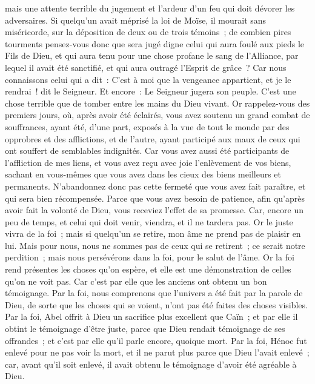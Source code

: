 \begin{multicols}{2}
mais une attente terrible du jugement et l'ardeur d'un feu qui doit dévorer les adversaires.
Si quelqu'un avait méprisé la loi de Moïse, il mourait sans miséricorde, sur la déposition de deux ou de trois témoins~;
de combien pires tourments pensez-vous donc que sera jugé digne celui qui aura foulé aux pieds le Fils de Dieu, et qui aura tenu pour une chose profane le sang de l'Alliance, par lequel il avait été sanctifié, et qui aura outragé l'Esprit de grâce~?
Car nous connaissons celui qui a dit~: C'est à moi que la vengeance appartient, et je le rendrai~! dit le Seigneur. Et encore~: Le Seigneur jugera son peuple.
C'est une chose terrible que de tomber entre les mains du Dieu vivant.
Or rappelez-vous des premiers jours, où, après avoir été éclairés, vous avez soutenu un grand combat de souffrances,
ayant été, d'une part, exposés à la vue de tout le monde par des opprobres et des afflictions, et de l'autre, ayant participé aux maux de ceux qui ont souffert de semblables indignités.
Car vous avez aussi été participants de l'affliction de mes liens, et vous avez reçu avec joie l'enlèvement de vos biens, sachant en vous-mêmes que vous avez dans les cieux des biens meilleurs et permanents.
N'abandonnez donc pas cette fermeté que vous avez fait paraître, et qui sera bien récompensée.
Parce que vous avez besoin de patience, afin qu'après avoir fait la volonté de Dieu, vous receviez l'effet de sa promesse.
Car, encore un peu de temps, et celui qui doit venir, viendra, et il ne tardera pas.
Or le juste vivra de la foi~; mais si quelqu'un se retire, mon âme ne prend pas de plaisir en lui.
Mais pour nous, nous ne sommes pas de ceux qui se retirent~; ce serait notre perdition~; mais nous persévérons dans la foi, pour le salut de l'âme.
\VerseOne{}Or la foi rend présentes les choses qu'on espère, et elle est une démonstration de celles qu'on ne voit pas.
Car c'est par elle que les anciens ont obtenu un bon témoignage.
Par la foi, nous comprenons que l'univers a été fait par la parole de Dieu, de sorte que les choses qui se voient, n'ont pas été faites des choses visibles.
Par la foi, Abel offrit à Dieu un sacrifice plus excellent que Caïn~; et par elle il obtint le témoignage d'être juste, parce que Dieu rendait témoignage de ses offrandes~; et c'est par elle qu'il parle encore, quoique mort.
Par la foi, Hénoc fut enlevé pour ne pas voir la mort, et il ne parut plus parce que Dieu l'avait enlevé~; car, avant qu'il soit enlevé, il avait obtenu le témoignage d'avoir été agréable à Dieu.

\end{multicols}
